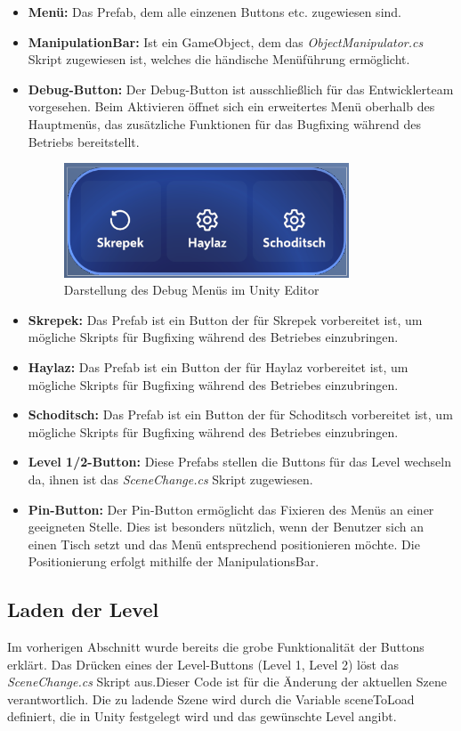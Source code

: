 \begin{itemize}
\item \textbf{Menü:} Das Prefab, dem alle einzenen Buttons etc. zugewiesen sind.
\item \textbf{ManipulationBar:} Ist ein GameObject, dem das \textit{ObjectManipulator.cs} Skript zugewiesen ist, welches
die händische Menüführung ermöglicht.
\item \textbf{Debug-Button:} Der Debug-Button ist ausschließlich für das Entwicklerteam vorgesehen. Beim Aktivieren öffnet
sich ein erweitertes Menü oberhalb des Hauptmenüs, das zusätzliche Funktionen für das Bugfixing während des Betriebs
bereitstellt.
\begin{figure}[h]
\centering
\includegraphics[width=0.8\textwidth]{images/debugmenubar.png}
\caption{Darstellung des Debug Menüs im Unity Editor}
\label{fig:debugmenübar}
\end{figure}
\item \textbf{Skrepek:} Das Prefab ist ein Button der für Skrepek vorbereitet ist, um mögliche Skripts für Bugfixing
während des Betriebes einzubringen.
\item \textbf{Haylaz:} Das Prefab ist ein Button der für Haylaz vorbereitet ist, um mögliche Skripts für Bugfixing
während des Betriebes einzubringen.
\item \textbf{Schoditsch:} Das Prefab ist ein Button der für Schoditsch vorbereitet ist, um mögliche Skripts für Bugfixing
während des Betriebes einzubringen.
\item \textbf{Level 1/2-Button:} Diese Prefabs stellen die Buttons für das Level wechseln da, ihnen ist das
\textit{SceneChange.cs} Skript zugewiesen.
\item \textbf{Pin-Button:} Der Pin-Button ermöglicht das Fixieren des Menüs an einer geeigneten Stelle. Dies ist besonders nützlich,
wenn der Benutzer sich an einen Tisch setzt und das Menü entsprechend positionieren möchte. Die
Positionierung erfolgt mithilfe der ManipulationsBar.
\end{itemize}

\subsection{Laden der Level}
Im vorherigen Abschnitt wurde bereits die grobe Funktionalität der Buttons erklärt. Das Drücken eines der Level-Buttons
(Level 1, Level 2) löst das \textit{SceneChange.cs} Skript aus.Dieser Code ist für die Änderung der aktuellen Szene
verantwortlich. Die zu ladende Szene wird durch die Variable sceneToLoad definiert, die in Unity festgelegt wird und das
gewünschte Level angibt.

